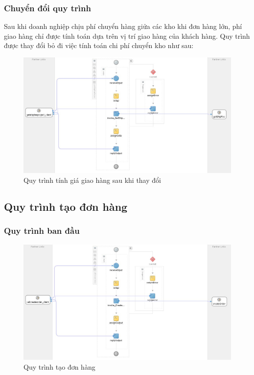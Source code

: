 \subsubsection*{Chuyển đổi quy trình}
Sau khi doanh nghiệp chịu phí chuyển hàng giửa các kho khi đơn hàng lớn, phí giao hàng chỉ được tính toán dựa trên vị trí giao hàng của khách hàng. Quy trình được thay đổi bỏ đi việc tính toán chi phí chuyển kho như sau:
\begin{figure}[!htp]
    \centering
    \includegraphics[width=12cm]{img/bpel/getShipFeeAfter.jpg}
    \newline
    \caption{Quy trình tính giá giao hàng sau khi thay đổi}
\end{figure}

\newpage
\subsection{Quy trình tạo đơn hàng}
\subsubsection*{Quy trình ban đầu}
\begin{figure}[!htp]
    \centering
    \includegraphics[width=12cm]{img/bpel/createOrder.jpg}
    \newline
    \caption{Quy trình tạo đơn hàng}
\end{figure}



